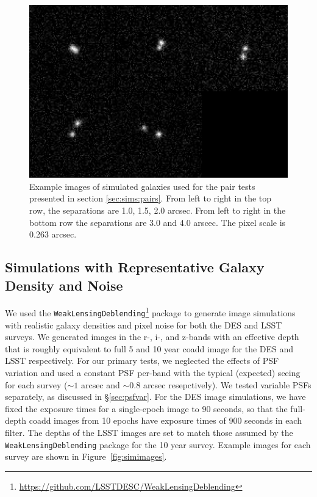 \documentclass[fleqn,useAMS,usenatbib]{mnras}
\begin{document}
\begin{figure}
    \includegraphics[width=\textwidth]{figures/bdk-comb.png}
    \caption{Example images of simulated galaxies used for the pair tests
    presented in section \ref{sec:sims:pairs}.  From left to right in the top row,
    the separations are 1.0, 1.5, 2.0 arcsec. From left to right in the bottom row the
    separations are 3.0 and 4.0 arscec. The pixel scale is 0.263 arcsec.
    \label{fig:pairs}}
\end{figure}

\subsection{Simulations with Representative Galaxy Density and Noise}
\label{sec:sims:realgals}

We used the
\texttt{WeakLensingDeblending}\footnote{\url{https://github.com/LSSTDESC/WeakLensingDeblending}}
package to generate image simulations with realistic galaxy densities and
pixel noise for both the DES and LSST surveys. We generated images in the r-,
i-, and z-bands with an effective depth that is roughly equivalent to full 5
and 10 year coadd image for the DES and LSST respectively. For our primary
tests, we neglected the effects of PSF variation and used a constant PSF
per-band with the typical (expected) seeing for each survey ($\sim\!1$ arcsec
and $\sim\!0.8$ arcsec resepctively). We tested variable PSFs separately, as
discussed in \S \ref{sec:psfvar}.  For the DES image simulations, we have fixed
the exposure times for a single-epoch image to 90 seconds, so that the
full-depth coadd images from 10 epochs have exposure times of 900 seconds in each
filter. The depths of the LSST images
are set to match those assumed by the \texttt{WeakLensingDeblending} package for the 10 year
survey. Example images for each survey are shown in Figure~\ref{fig:simimages}.
\end{document}

